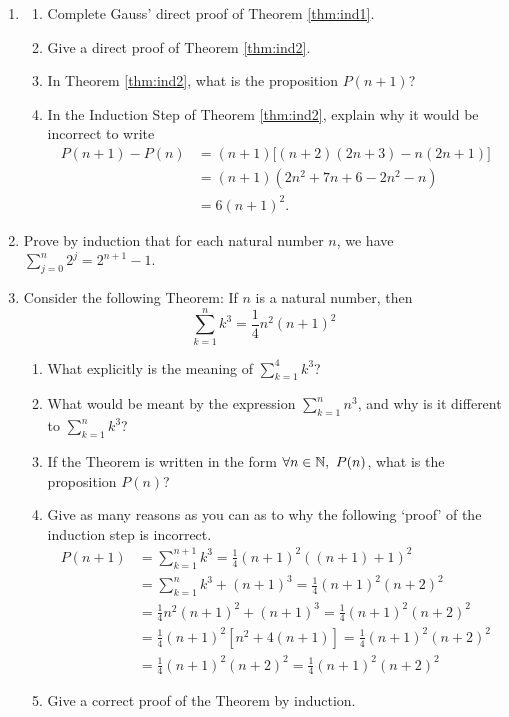 \begin{exercises}{}{}

\begin{enumerate}
  \item\begin{enumerate}
    \item Complete Gauss' direct proof of Theorem \ref{thm:ind1}.
    \item Give a direct proof of Theorem \ref{thm:ind2}.
    \item In Theorem \ref{thm:ind2}, what is the proposition $P(n+1)$?
    \item In the Induction Step of Theorem \ref{thm:ind2}, explain why it would be incorrect to write
    \begin{align*}
		P(n+1)-P(n)&=(n+1)\bigl[(n+2)(2n+3)-n(2n+1)\bigr]\\
		&=(n+1)(2n^2+7n+6-2n^2-n)\\
		&=6(n+1)^2.
		\end{align*}
  \end{enumerate}
  
  \item Prove by induction that for each natural number $n$, we have $\sum\limits_{j=0}^n2^j=2^{n+1}-1$.
	
	\item Consider the following Theorem: If $n$ is a natural number, then 
	\[\sum\limits_{k=1}^nk^3=\frac 14n^2(n+1)^2\]
	\begin{enumerate}
	  \item What explicitly is the meaning of $\sum\limits_{k=1}^4k^3$?
	  \item What would be meant by the expression $\sum\limits_{k=1}^nn^3$, and why is it different to $\sum\limits_{k=1}^nk^3$?
	  \item If the Theorem is written in the form $\forall n\in\mathbb{N},\ P(n)$, what is the proposition $P(n)$?
	  \item Give as many reasons as you can as to why the following `proof' of the induction step is incorrect. 
	  \begin{align*}
	  P(n+1)&=\sum\limits_{k=1}^{n+1}k^3=\frac 14(n+1)^2((n+1)+1)^2\\
	  &=\sum\limits_{k=1}^nk^3+(n+1)^3=\frac 14(n+1)^2(n+2)^2\\
	  &=\frac 14n^2(n+1)^2+(n+1)^3=\frac 14(n+1)^2(n+2)^2\\
	  &=\frac 14(n+1)^2\left[n^2+4(n+1)\right]=\frac 14(n+1)^2(n+2)^2\\
	  &=\frac 14(n+1)^2(n+2)^2=\frac 14(n+1)^2(n+2)^2
	  \end{align*}
	  \item Give a correct proof of the Theorem by induction.
  \end{enumerate}
	

\end{enumerate}
\end{exercises}
